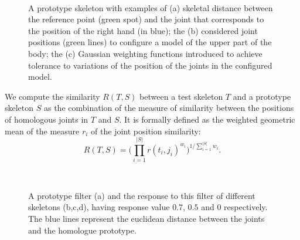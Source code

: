 \documentclass[runningheads,a4paper]{llncs}
\begin{document}
\begin{figure}[!t]
   \centering
    \setlength{\unitlength}{50mm}%
 ~
  ~
 ~
   \caption{A prototype skeleton with examples of (a) skeletal distance between the reference point (green spot) and the joint that corresponds to the position of the right hand (in blue); the (b) considered joint positions (green lines) to configure a model of the upper part of the body; the (c) Gaussian weighting functions introduced to achieve tolerance to variations of the position of the joints in the configured model.}
   \label{fig:filter}
\end{figure}


We compute the similarity $R(T, S)$ between a test skeleton $T$ and a prototype skeleton $S$ as the combination of the measure of similarity between the positions of homologous joints in $T$ and $S$.
It is formally defined as the weighted geometric mean of the measure $r_i$ of the joint position similarity:
\begin{equation}
 R(T,S) = \bigg(\prod_{i=1}^{|S|} r(t_i,j_i)^{w_i}\bigg)^{1/\sum_{i=1}^{|S|}w_i}.
\end{equation}


\begin{figure}[!t]
   \centering
          \setlength{\unitlength}{50mm}%
~
~
~
   \caption{A prototype filter (a) and the response to this filter of different skeletons (b,c,d), having response value $0.7$, $0.5$ and $0$ respectively. The blue lines represent the euclidean distance between the joints and the homologue prototype.}
   \label{fig:filter_application}
\end{figure}
\end{document}
